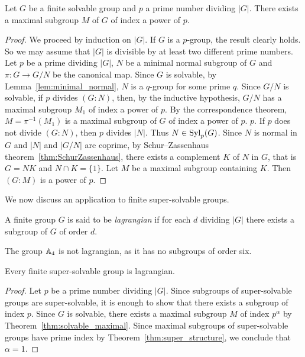 
\begin{theorem}
	\label{thm:solvable_maximal}
	Let $G$ be a finite solvable group and $p$ a prime number dividing $|G|$. There exists a maximal 
    subgroup $M$ of $G$ of index a power of $p$. 
\end{theorem}

\begin{proof}
	We proceed by induction on $|G|$. If $G$ is a $p$-group, the result clearly holds. So we may assume that $|G|$ is divisible by at least two different prime numbers. 
    Let $p$ be a prime dividing $|G|$, $N$ be a minimal normal subgroup of $G$ and 
    $\pi\colon G\to G/N$ be the canonical map. Since $G$ is solvable, by Lemma~\ref{lem:minimal_normal}, 
    $N$ is a $q$-group for some prime $q$. Since $G/N$ is solvable, if $p$ divides 
	$(G:N)$, then, by the inductive hypothesis, $G/N$ has a maximal subgroup 
 	$M_1$ of index a power of $p$. By the correspondence theorem, 
  $M=\pi^{-1}(M_1)$ is a maximal subgroup of $G$ of index a power of $p$. 
  $p$. If $p$ does not divide $(G:N)$, then $p$ divides $|N|$. Thus 
	$N\in\mathrm{Syl}_p(G)$. Since $N$ is normal in $G$ and $|N|$ and $|G/N|$ are coprime, by 
	Schur--Zassenhaus theorem~\ref{thm:SchurZassenhaus}, 
	there exists a complement $K$ of $N$ in $G$, that is $G=NK$ and $N\cap K=\{1\}$. Let 
	$M$ be a maximal subgroup containing $K$. Then $(G:M)$ is a power of $p$. 
\end{proof}

We now discuss an application to finite super-solvable groups. 

\begin{definition}
	A finite group $G$ is said to be \emph{lagrangian} if for each $d$ dividing $|G|$ 
	there exists a subgroup of $G$ of order $d$.
\end{definition}

The group $\mathbb{A}_4$ is not lagrangian, as it has no subgroups of order six. 

\begin{theorem}
	Every finite super-solvable group is lagrangian. 
\end{theorem}

\begin{proof}
	Let $p$ be a prime number dividing $|G|$. Since subgroups of super-solvable groups are super-solvable, it is enough to 
    show that there exists a subgroup of index $p$. 
	Since $G$ is solvable, there exists a maximal subgroup $M$ of index 
	$p^{\alpha}$ by Theorem~\ref{thm:solvable_maximal}. Since maximal 
 subgroups of super-solvable groups have prime index 
    by Theorem~\ref{thm:super_structure}, we conclude that $\alpha=1$.
\end{proof}

